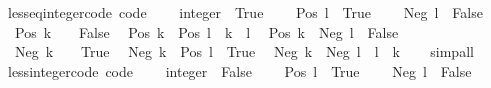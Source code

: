 \begin{isabellebody}
\isanewline
%
\endisadelimproof
\isanewline
{}\isamarkupfalse%
\ less{\isacharunderscore}{\kern0pt}eq{\isacharunderscore}{\kern0pt}integer{\isacharunderscore}{\kern0pt}code\ {\isacharbrackleft}{\kern0pt}code{\isacharbrackright}{\kern0pt}{\isacharcolon}{\kern0pt}\isanewline
\ \ {\isachardoublequoteopen}{}\ {\isasymle}\ {\isacharparenleft}{\kern0pt}{}{\isacharcolon}{\kern0pt}{\isacharcolon}{\kern0pt}integer{\isacharparenright}{\kern0pt}\ {\isasymlongleftrightarrow}\ True{\isachardoublequoteclose}\isanewline
\ \ {\isachardoublequoteopen}{}\ {\isasymle}\ Pos\ l\ {\isasymlongleftrightarrow}\ True{\isachardoublequoteclose}\isanewline
\ \ {\isachardoublequoteopen}{}\ {\isasymle}\ Neg\ l\ {\isasymlongleftrightarrow}\ False{\isachardoublequoteclose}\isanewline
\ \ {\isachardoublequoteopen}Pos\ k\ {\isasymle}\ {}\ {\isasymlongleftrightarrow}\ False{\isachardoublequoteclose}\isanewline
\ \ {\isachardoublequoteopen}Pos\ k\ {\isasymle}\ Pos\ l\ {\isasymlongleftrightarrow}\ k\ {\isasymle}\ l{\isachardoublequoteclose}\isanewline
\ \ {\isachardoublequoteopen}Pos\ k\ {\isasymle}\ Neg\ l\ {\isasymlongleftrightarrow}\ False{\isachardoublequoteclose}\isanewline
\ \ {\isachardoublequoteopen}Neg\ k\ {\isasymle}\ {}\ {\isasymlongleftrightarrow}\ True{\isachardoublequoteclose}\isanewline
\ \ {\isachardoublequoteopen}Neg\ k\ {\isasymle}\ Pos\ l\ {\isasymlongleftrightarrow}\ True{\isachardoublequoteclose}\isanewline
\ \ {\isachardoublequoteopen}Neg\ k\ {\isasymle}\ Neg\ l\ {\isasymlongleftrightarrow}\ l\ {\isasymle}\ k{\isachardoublequoteclose}\isanewline
%
\isadelimproof
\ \ %
\endisadelimproof
%
\isatagproof
{}\isamarkupfalse%
\ simp{\isacharunderscore}{\kern0pt}all%
\endisatagproof
{\isafoldproof}%
%
\isadelimproof
\isanewline
%
\endisadelimproof
\isanewline
{}\isamarkupfalse%
\ less{\isacharunderscore}{\kern0pt}integer{\isacharunderscore}{\kern0pt}code\ {\isacharbrackleft}{\kern0pt}code{\isacharbrackright}{\kern0pt}{\isacharcolon}{\kern0pt}\isanewline
\ \ {\isachardoublequoteopen}{}\ {\isacharless}{\kern0pt}\ {\isacharparenleft}{\kern0pt}{}{\isacharcolon}{\kern0pt}{\isacharcolon}{\kern0pt}integer{\isacharparenright}{\kern0pt}\ {\isasymlongleftrightarrow}\ False{\isachardoublequoteclose}\isanewline
\ \ {\isachardoublequoteopen}{}\ {\isacharless}{\kern0pt}\ Pos\ l\ {\isasymlongleftrightarrow}\ True{\isachardoublequoteclose}\isanewline
\ \ {\isachardoublequoteopen}{}\ {\isacharless}{\kern0pt}\ Neg\ l\ {\isasymlongleftrightarrow}\ False{\isachardoublequoteclose}\isanewline

\end{isabellebody}

